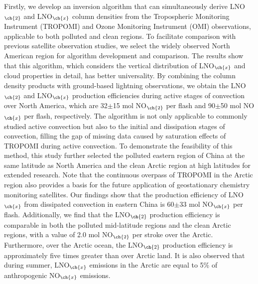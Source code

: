 {Firstly, we develop an inversion algorithm that can simultaneously derive LNO$_{\ch{2}}$ and LNO$_{\ch{x}}$ column densities from the Tropospheric Monitoring Instrument (TROPOMI) and Ozone Monitoring Instrument (OMI) observations, applicable to both polluted and clean regions.
To facilitate comparison with previous satellite observation studies, we select the widely observed North American region for algorithm development and comparison.
The results show that this algorithm, which considers the vertical distribution of LNO$_{\ch{x}}$ and cloud properties in detail, has better universality.
By combining the column density products with ground-based lightning observations, we obtain the LNO$_{\ch{2}}$ and LNO$_{\ch{x}}$ production efficiencies during active stages of convection over North America, which are 32$\pm$15 mol NO$_{\ch{2}}$ per flash and 90$\pm$50 mol NO$_{\ch{x}}$ per flash, respectively.
The algorithm is not only applicable to commonly studied active convection but also to the initial and dissipation stages of convection, filling the gap of missing data caused by saturation effects of TROPOMI during active convection.
To demonstrate the feasibility of this method, this study further selected the polluted eastern region of China at the same latitude as North America and the clean Arctic region at high latitudes for extended research.
Note that the continuous overpass of TROPOMI in the Arctic region also provides a basis for the future application of geostationary chemistry monitoring satellites.
Our findings show that the production efficiency of LNO$_{\ch{x}}$ from dissipated convection in eastern China is 60$\pm$33 mol NO$_{\ch{x}}$ per flash.
Additionally, we find that the LNO$_{\ch{2}}$ production efficiency is comparable in both the polluted mid-latitude regions and the clean Arctic regions, with a value of 2.0 mol NO$_{\ch{2}}$ per stroke over the Arctic.
Furthermore, over the Arctic ocean, the LNO$_{\ch{2}}$ production efficiency is approximately five times greater than over Arctic land.
It is also observed that during summer, LNO$_{\ch{x}}$ emissions in the Arctic are equal to 5\% of anthropogenic NO$_{\ch{x}}$ emissions.

}
